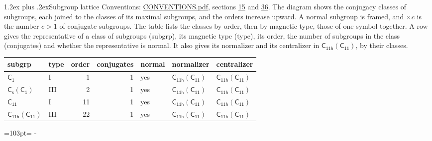 \documentclass[10pt,a4paper]{article}
\makeatletter
\renewcommand\section{\@startsection{section}{1}{\z@}{-3ex plus -1ex minus -.2ex}%
  {1.2ex plus .2ex}{\normalfont\large\sffamily\bfseries\color{parttitle}}}
\newcommand{\needspace}[1]{\par\penalty-100\begingroup\dimen0=#1\relax\dimen2=\pagegoal
  \advance\dimen2-\pagetotal\ifdim\dimen0>\dimen2\relax\ifdim\dimen2>0pt\vfil\break\fi\fi
  \endgroup}
\numberwithin{equation}{section}
\newcommand{\grp}[1]{\mathsf{#1}}
\makeatother
\begin{document}
\section{Subgroup lattice}\label{s:subgroups}
Conventions: \href{../../CONVENTIONS.pdf}{CONVENTIONS.pdf}, sections \href{../../../rotation/CONVENTIONS.pdf\#conv.15}{15} and \href{../../CONVENTIONS.pdf\#conv.36}{36}.
The diagram shows the conjugacy classes of subgroups, each joined to the classes of its maximal subgroups, and the orders increase upward. \label{n:index.conjugates.c}A normal subgroup is framed, and ${\times}c$ is the number $c > 1$ of conjugate subgroups. The table lists the classes by order, then by magnetic type, those of one symbol together. \label{n:head.subgroup}\label{n:head.magnetic.type}\label{n:head.order}\label{n:head.conjugates}\label{n:head.normal}A row gives the representative of a class of subgroups (subgrp), its magnetic type (type), its order, the number of subgroups in the class (conjugates) and whether the representative is normal. \label{n:head.normalizer}\label{n:head.centralizer}It also gives its normalizer and its centralizer in $\grp{C_{11h}}(\grp{C_{11}})$, by their classes. 
\begin{center}
\end{center}
{\small\begin{longtable}{@{}llrrlll@{}}\toprule
subgrp & type & order & conjugates & normal & normalizer & centralizer\\\midrule\endhead
\bottomrule\endfoot\endlastfoot
\href{../../../rotation/data/pdf/C1.pdf}{$\grp{C_{1}}$} & I & 1 & 1 & yes & \href{C11h-C11.pdf}{$\grp{C_{11h}}(\grp{C_{11}})$} & \href{C11h-C11.pdf}{$\grp{C_{11h}}(\grp{C_{11}})$}\\*
\href{C1v-C1.pdf}{$\grp{C_{s}}(\grp{C_{1}})$} & III & 2 & 1 & yes & \href{C11h-C11.pdf}{$\grp{C_{11h}}(\grp{C_{11}})$} & \href{C11h-C11.pdf}{$\grp{C_{11h}}(\grp{C_{11}})$}\\*
\href{../../../rotation/data/pdf/C11.pdf}{$\grp{C_{11}}$} & I & 11 & 1 & yes & \href{C11h-C11.pdf}{$\grp{C_{11h}}(\grp{C_{11}})$} & \href{C11h-C11.pdf}{$\grp{C_{11h}}(\grp{C_{11}})$}\\*
\href{C11h-C11.pdf}{$\grp{C_{11h}}(\grp{C_{11}})$} & III & 22 & 1 & yes & \href{C11h-C11.pdf}{$\grp{C_{11h}}(\grp{C_{11}})$} & \href{C11h-C11.pdf}{$\grp{C_{11h}}(\grp{C_{11}})$}\\
\bottomrule\end{longtable}}
\needspace{103pt}
\end{document}

